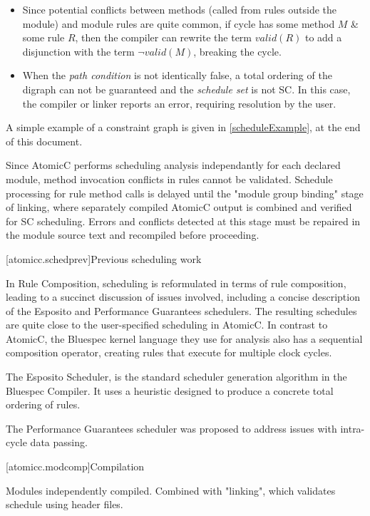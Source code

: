 \begin{itemize}
\item Since potential conflicts between methods (called from rules outside the module)
and module rules are quite common,
if cycle has some method $M$ \& some rule $R$, then the compiler can
rewrite the term $valid(R)$ to add a disjunction with the term $\neg valid(M)$, breaking
the cycle.

\item When the \textit{path condition} is not identically false, a total ordering of
the digraph can not be guaranteed and the \textit{schedule set} is not SC.
In this case, the compiler or linker reports an error,
requiring resolution by the user.
\end{itemize}

A simple example of a constraint graph is given in \ref{scheduleExample}, at the end of this document.

Since AtomicC performs scheduling analysis independantly for each
declared module, method invocation conflicts in rules cannot be validated.
Schedule processing for rule method calls is delayed until the "module group binding"
stage of linking, where separately compiled AtomicC output is combined and
verified
for SC scheduling.  Errors and conflicts detected at this stage must be repaired
in the module source text and recompiled before proceeding.

[atomicc.schedprev]{Previous scheduling work}

In Rule Composition\cite{Dave2007}, scheduling
is reformulated in terms of rule composition, leading to a succinct discussion
of issues involved, including a concise description of the Esposito and
Performance Guarantees schedulers.  The resulting schedules are quite close
to the user-specified scheduling in AtomicC.
In contrast to AtomicC, the Bluespec kernel language they use
for analysis also has a sequential composition operator, creating rules
that execute for multiple clock cycles.

The Esposito Scheduler\cite{Esposito:Patent,Dave2007},
is the standard scheduler generation algorithm in the Bluespec Compiler.
It uses a heuristic designed to produce a concrete total ordering of rules.

The Performance Guarantees scheduler\cite{Rosenband:PerformanceGuarantees}
was proposed to address issues with intra-cycle data passing.

\newpage
{}[atomicc.modcomp]{Compilation}

Modules independently compiled.  Combined with "linking", which validates schedule using header files.

